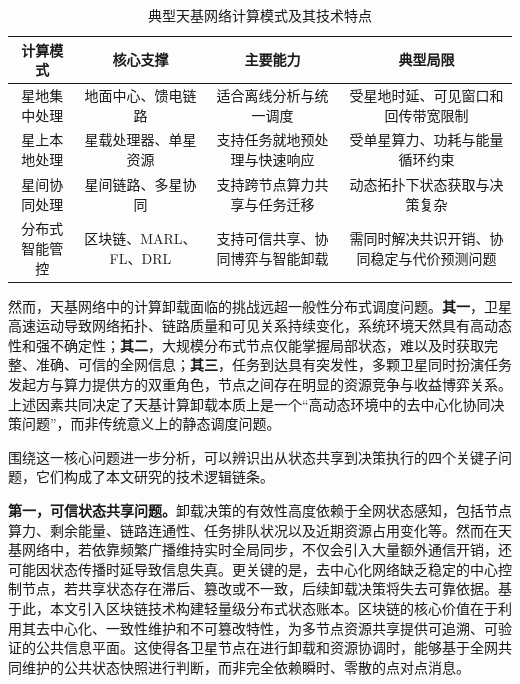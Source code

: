 \begin{table}[htbp]
  \centering
  \caption{典型天基网络计算模式及其技术特点}
  \label{tab:computing_modes}
  \begin{tabularx}{\textwidth}{CCCC}
    \toprule
    \textbf{计算模式} & \textbf{核心支撑}   & \textbf{主要能力}    & \textbf{典型局限}         \\
    \midrule
    星地集中处理        & 地面中心、馈电链路       & 适合离线分析与统一调度      & 受星地时延、可见窗口和回传带宽限制     \\
    星上本地处理        & 星载处理器、单星资源      & 支持任务就地预处理与快速响应   & 受单星算力、功耗与能量循环约束       \\
    星间协同处理        & 星间链路、多星协同       & 支持跨节点算力共享与任务迁移   & 动态拓扑下状态获取与决策复杂        \\
    分布式智能管控       & 区块链、MARL、FL、DRL & 支持可信共享、协同博弈与智能卸载 & 需同时解决共识开销、协同稳定与代价预测问题 \\
    \bottomrule
  \end{tabularx}
\end{table}

然而，天基网络中的计算卸载面临的挑战远超一般性分布式调度问题。\textbf{其一}，卫星高速运动导致网络拓扑、链路质量和可见关系持续变化，系统环境天然具有高动态性和强不确定性；\textbf{其二}，大规模分布式节点仅能掌握局部状态，难以及时获取完整、准确、可信的全网信息；\textbf{其三}，任务到达具有突发性，多颗卫星同时扮演任务发起方与算力提供方的双重角色，节点之间存在明显的资源竞争与收益博弈关系。上述因素共同决定了天基计算卸载本质上是一个“高动态环境中的去中心化协同决策问题”，而非传统意义上的静态调度问题。

围绕这一核心问题进一步分析，可以辨识出从状态共享到决策执行的四个关键子问题，它们构成了本文研究的技术逻辑链条。

\textbf{第一，可信状态共享问题。}卸载决策的有效性高度依赖于全网状态感知，包括节点算力、剩余能量、链路连通性、任务排队状况以及近期资源占用变化等。然而在天基网络中，若依靠频繁广播维持实时全局同步，不仅会引入大量额外通信开销，还可能因状态传播时延导致信息失真。更关键的是，去中心化网络缺乏稳定的中心控制节点，若共享状态存在滞后、篡改或不一致，后续卸载决策将失去可靠依据。基于此，本文引入区块链技术构建轻量级分布式状态账本。区块链的核心价值在于利用其去中心化、一致性维护和不可篡改特性，为多节点资源共享提供可追溯、可验证的公共信息平面\cite{ref6,ref7,ref8}。这使得各卫星节点在进行卸载和资源协调时，能够基于全网共同维护的公共状态快照进行判断，而非完全依赖瞬时、零散的点对点消息。


